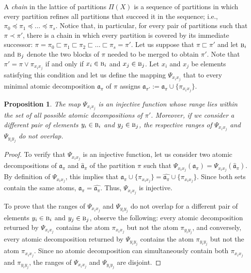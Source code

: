\documentclass[12pt]{extarticle}
\newtheorem{Proposition}{Proposition}
\begin{document}
	A \emph{chain} in the lattice of partitions $\Pi(X)$ is a sequence of partitions in which every partition refines all partitions  that succeed it in the sequence; i.e., $\pi_0\preceq\pi_1\preceq\ldots\preceq\pi_s$.  Notice that, in particular, for every pair of partitions such that $\pi\prec\pi'$,  there is a chain in which every partition is covered by its immediate successor: $\pi=\pi_0\sqsubset\pi_1\sqsubset\pi_2\sqsubset\ldots\sqsubset\pi_s=\pi'$. Let us suppose that $\pi\sqsubset \pi'$ and let $\textsc{b}_i$ and $\textsc{b}_j$ denote the two blocks of $\pi$ needed to be merged to obtain $\pi'$. Note that $\pi' = \pi\vee\pi_{x_ix_j}$ if and only if 
	$x_i\in \textsc{b}_i$ and $x_j\in \textsc{b}_j$. Let  $x_i$ and $x_j$ be elements satisfying this condition and let us define the mapping $\Psi_{x_ix_j}$ that to every minimal atomic decomposition $\mathfrak{a}_{\pi}$ of $\pi$ assigns $\mathfrak{a}_{\pi'}:=\mathfrak{a}_{\pi}\cup \{\pi_{x_ix_j}\}$. 
	
	\begin{Proposition}\label{addinganatominjections}
		The map $\Psi_{x_ix_j}$ is an injective function whose range lies within the set of all possible atomic decompositions of $\pi'$. Moreover, if we consider a different pair of elements $y_i\in \textsc{b}_i$ and $y_j\in \textsc{b}_j$, the respective ranges of $\Psi_{x_ix_j}$ and $\Psi_{y_iy_j}$ do not overlap.
	\end{Proposition}
	\begin{proof} To verify that $\Psi_{x_ix_j}$ is an injective function, let us consider two atomic decompositions of $\mathfrak{a}_{\pi}$ and $\hat{\mathfrak{a}}_{\pi}$ of the partition $\pi$ such that $\Psi_{x_ix_j}\left(\mathfrak{a}_{\pi}\right)=\Psi_{x_ix_j}\left(\hat{\mathfrak{a}}_{\pi}\right)$. By definition of $\Psi_{x_ix_j}$, 
		this implies that $\mathfrak{a}_{\pi}\cup \{\pi_{x_ix_j}\} = \hat{\mathfrak{a}_{\pi}}\cup \{\pi_{x_ix_j}\}$. Since both sets contain the same atoms, $\mathfrak{a}_{\pi}=\hat{\mathfrak{a}_{\pi}}$. Thus, $\Psi_{x_ix_j}$ is injective.
		
		To prove that  the ranges of $\Psi_{x_ix_j}$ and  $\Psi_{y_iy_j}$ do not overlap for a different pair of elements $y_i\in \textsc{b}_i$ and $y_j\in \textsc{b}_j$, observe the following: every atomic decomposition returned by $\Psi_{x_ix_j}$ contains the atom $\pi_{x_ix_j}$ but not the atom $\pi_{y_iy_j}$, and conversely, every atomic decomposition returned by $\Psi_{y_iy_j}$ contains the atom $\pi_{y_iy_j}$ but not the atom $\pi_{x_ix_j}$. Since no atomic decomposition can simultaneously contain both $\pi_{x_ix_j}$ and $\pi_{y_iy_j}$, the ranges of $\Psi_{x_ix_j}$ and  $\Psi_{y_iy_j}$ are disjoint.
	\end{proof}
	
\end{document}
